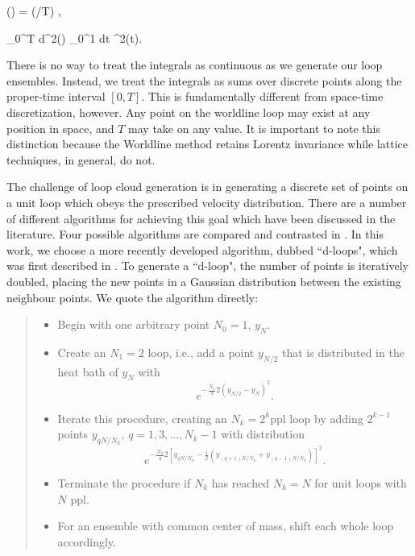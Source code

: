 \be 
{}(\tau) = (\tau/T) ,
\ee

\be \int_0^T d\tau {}^2(\tau) \rightarrow \int_0^1 dt
^2(t).
\ee

There is no way to treat the integrals as continuous as we generate our loop
ensembles.  Instead, we treat the integrals as sums over discrete points
along the proper-time interval $[0,T]$.  This is fundamentally different
from space-time discretization, however.  Any point on the worldline loop
may exist at any position in space, and $T$ may take on any value.  It is
important to note this distinction because the Worldline method retains
Lorentz invariance while lattice techniques, in general, do not.

The challenge of loop cloud generation is in generating a discrete set
of points on a unit loop which obeys the prescribed velocity distribution.
There are a number of different algorithms for achieving this goal which have
been discussed in the literature.  Four possible algorithms are compared
and contrasted in \cite{Gies:2003cv}.  In this work, we choose a more
recently developed algorithm, dubbed ``d-loops", which was first described
in \cite{Gies:2005sb}. To generate a ``d-loop", the number of points is iteratively 
doubled, placing the new points in a Gaussian distribution between the existing neighbour points.
We quote the algorithm directly:

\begin{quote} 
  \begin{singlespace}
    \begin{itemize} 
	  \item[(1)] Begin with one arbitrary point
		$N_0=1$, $y_{N}$.

	  \item[(2)] Create an $N_1=2$ loop, i.e., add a point $y_{N/2}$ that is
	    distributed in the heat bath of $y_N$ with
	   \begin{equation} 
		 e^{-\frac{N_1}{4} 2 (y_{N/2} -y_{N})^2}. \label{yn2}
	   \end{equation}

      \item[(3)] Iterate this procedure, creating an $N_k=2^k$ppl loop by
        adding $2^{k-1}$ points $y_{{qN}/{N_k}}$, $q=1,3,\dots, N_k-1$ with
        distribution
      \begin{equation} 
	    e^{-\frac{N_k}{4} 2 [y_{qN/N_k} -\frac{1}{2}(y_{(q+1)N/N_k}+
		y_{(q-1)N/N_k})]^2}. \label{ynk}
	  \end{equation}

      \item[(4)] Terminate the procedure if $N_k$ has reached $N_k=N$ for
        unit loops with $N$ ppl.

      \item[(5)] For an ensemble with common center of mass, shift each
        whole loop accordingly.

    \end{itemize}
  \end{singlespace}	
\end{quote}

